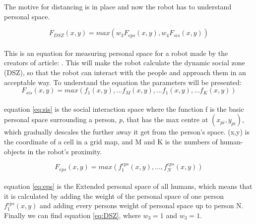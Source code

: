 The motive for distancing is in place and now the robot has to understand personal space. 

\begin{equation} \label{eq:DSZ}
    F_{DSZ}(x,y) = max(w_3F_{eps}(x,y),w_4F_{sis}(x,y))
\end{equation}\\

This is an equation for measuring personal space for a robot made by the creators of article: \cite{Truong2016}. This will make the robot calculate the dynamic social zone (DSZ), so that the robot can interact with the people and approach them in an acceptable way. To understand the equation the parameters will be presented:\\

\begin{equation}\label{eq:sis}
    F_{sis}(x,y) = max(f_1(x,y),...f_M(x,y),...f_1(x,y),...f_K(x,y))
\end{equation}\\

equation \ref{eq:sis} is the social interaction space where the function f is the basic personal space surrounding a person, \textit{p}, that has the max centre at $(x_{pi},y_{pi})$, which gradually descales the further away it get from the person's space. (x,y) is the coordinate of a cell in a grid map, and M and K is the numbers of human-objects in the robot's proximity.

\begin{equation} \label{eq:eps}
    F_{eps}(x,y) = max(f^{eps}_1(x,y),...,f^{eps}_N(x,y))
\end{equation}\\

equation \ref{eq:eps} is the Extended personal space of all humans, which means that it is calculated by adding the weight of the personal space of one person $f^{eps}_1(x,y)$ and adding every persons weight of personal space up to person N. Finally we can find equation \ref{eq:DSZ}, where $w_3 = 1$ and $w_3 = 1$. 